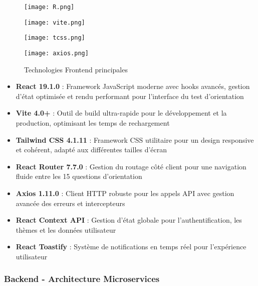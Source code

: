 \documentclass[12pt,a4paper]{report}
\begin{document}
\begin{figure}[H]
\centering
\begin{minipage}{0.2\textwidth}
\centering
\texttt{[image: R.png]}
\end{minipage}
\hfill
\begin{minipage}{0.2\textwidth}
\centering
\texttt{[image: vite.png]}
\end{minipage}
\hfill
\begin{minipage}{0.2\textwidth}
\centering
\texttt{[image: tcss.png]}
\end{minipage}
\hfill
\begin{minipage}{0.2\textwidth}
\centering
\texttt{[image: axios.png]}
\end{minipage}
\caption{Technologies Frontend principales}
\label{fig:frontend-tech}
\end{figure}

\begin{itemize}
    \item \textbf{React 19.1.0} : Framework JavaScript moderne avec hooks avancés, gestion d'état optimisée et rendu performant pour l'interface du test d'orientation
    \item \textbf{Vite 4.0+} : Outil de build ultra-rapide pour le développement et la production, optimisant les temps de rechargement
    \item \textbf{Tailwind CSS 4.1.11} : Framework CSS utilitaire pour un design responsive et cohérent, adapté aux différentes tailles d'écran
    \item \textbf{React Router 7.7.0} : Gestion du routage côté client pour une navigation fluide entre les 15 questions d'orientation
    \item \textbf{Axios 1.11.0} : Client HTTP robuste pour les appels API avec gestion avancée des erreurs et intercepteurs
    \item \textbf{React Context API} : Gestion d'état globale pour l'authentification, les thèmes et les données utilisateur
    \item \textbf{React Toastify} : Système de notifications en temps réel pour l'expérience utilisateur
\end{itemize}

\subsubsection{Backend - Architecture Microservices}
\end{document}
